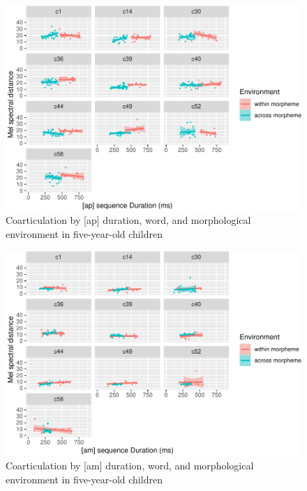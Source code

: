 \documentclass[a4paper,man,floatsintext,natbib,donotrepeattitle, apacite]{apa6}
\begin{document}
\begin{figure}
\centering
\includegraphics{3_ch3_results_files/figure-latex/five-facet-ap-1.pdf}
\caption{\label{fig:five-facet-ap}Coarticulation by {[}ap{]} duration, word, and morphological environment in five-year-old children}
\end{figure}

\begin{figure}
\centering
\includegraphics{3_ch3_results_files/figure-latex/five-facet-am-1.pdf}
\caption{\label{fig:five-facet-am}Coarticulation by {[}am{]} duration, word, and morphological environment in five-year-old children}
\end{figure}
\end{document}
